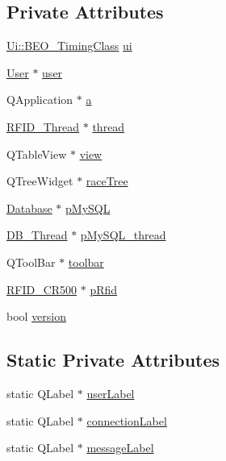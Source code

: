\subsection*{Private Attributes}
\begin{CompactItemize}
\item 
\hyperlink{class_ui_1_1_b_e_o___timing_class}{Ui::BEO\_\-TimingClass} \hyperlink{class_b_e_o___timing_4e75592803bdf66af32320a30b8972c2}{ui}
\item 
\hyperlink{class_user}{User} $\ast$ \hyperlink{class_b_e_o___timing_36f4e79080543317d02636f93b667c27}{user}
\item 
QApplication $\ast$ \hyperlink{class_b_e_o___timing_8d2d841d6eb959c49a406ecebeb3374d}{a}
\item 
\hyperlink{class_r_f_i_d___thread}{RFID\_\-Thread} $\ast$ \hyperlink{class_b_e_o___timing_3f78ca1ff8e8b783d594c615e1204690}{thread}
\item 
QTableView $\ast$ \hyperlink{class_b_e_o___timing_48b9d6ca16febbddf487260d130925b1}{view}
\item 
QTreeWidget $\ast$ \hyperlink{class_b_e_o___timing_2ec471682ac3f39eedd965fa2e94f3d7}{raceTree}
\item 
\hyperlink{class_database}{Database} $\ast$ \hyperlink{class_b_e_o___timing_59ff5cd2ab570b6aaec5e4d6367e107b}{pMySQL}
\item 
\hyperlink{class_d_b___thread}{DB\_\-Thread} $\ast$ \hyperlink{class_b_e_o___timing_2690847a55f7a275ba0df12f8a5e5827}{pMySQL\_\-thread}
\item 
QToolBar $\ast$ \hyperlink{class_b_e_o___timing_a12a334dd438e255a500dc7591e1f588}{toolbar}
\item 
\hyperlink{class_r_f_i_d___c_r500}{RFID\_\-CR500} $\ast$ \hyperlink{class_b_e_o___timing_a68330ea7c66ad7f7cf913e31d6facf2}{pRfid}
\item 
bool \hyperlink{class_b_e_o___timing_670385786b671be23b3b3b10dd3e7b91}{version}
\end{CompactItemize}
\subsection*{Static Private Attributes}
\begin{CompactItemize}
\item 
static QLabel $\ast$ \hyperlink{class_b_e_o___timing_7f14795095b944fc64585ec6af1df23a}{userLabel}
\item 
static QLabel $\ast$ \hyperlink{class_b_e_o___timing_c021ff5e0e3900e27fb3fece4c719238}{connectionLabel}
\item 
static QLabel $\ast$ \hyperlink{class_b_e_o___timing_4d07aaff9e9e351ae75ec2b607157419}{messageLabel}
\end{CompactItemize}


